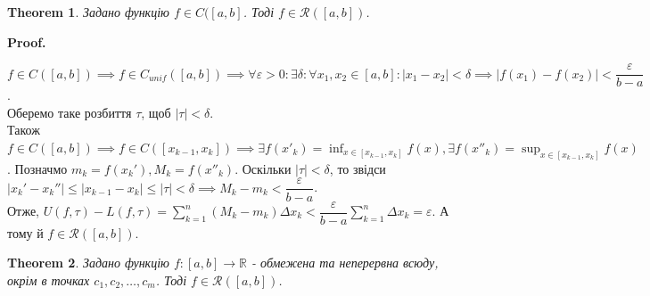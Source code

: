 \documentclass[a4paper, 10pt]{article}
\makeatletter
\def\huge{\displaystyle}
\def\qed{$\blacksquare$}
\theoremstyle{theoremdd}
\newtheorem{theorem}{Theorem}[subsection]
\theoremstyle{theoremdd}
\theoremstyle{theoremdd}
\theoremstyle{theoremdd}
\theoremstyle{theoremdd}
\theoremstyle{theoremdd}
\theoremstyle{theoremdd}
\theoremstyle{theoremdd}
\theoremstyle{theoremdd}
\renewenvironment{proof}[1][Proof.\\]{\par
\pushQED{\hfill \qed}%
\normalfont \topsep6\p@\@plus6\p@\relax
\trivlist
\item\relax
{\bfseries
#1\@addpunct{.}}\hspace\labelsep\ignorespaces
}{%
\popQED\endtrivlist\@endpefalse
}
\makeatother
\begin{document}
\begin{theorem}
Задано функцію $f \in C([a,b]$. Тоді $f \in \mathcal{R}([a,b])$.
\end{theorem}

\begin{proof}
$f \in C([a,b]) \implies f \in C_{unif}([a,b]) \implies \forall \varepsilon > 0: \exists \delta: \forall x_1,x_2 \in [a,b]: |x_1-x_2| < \delta \implies |f(x_1)-f(x_2)| < \dfrac{\varepsilon}{b-a}$.\\
Оберемо таке розбиття $\tau$, щоб $|\tau| < \delta$.\\
Також $f \in C([a,b]) \implies f \in C([x_{k-1},x_k]) \implies \huge \exists f(x'_k) = \inf_{x \in [x_{k-1},x_k]} f(x), \exists f(x''_k) = \sup_{x \in [x_{k-1},x_k]} f(x)$. Позначмо $m_k = f(x_k'), M_k = f(x''_k)$. Оскільки $|\tau| < \delta$, то звідси $|x_k'-x_k''| \leq |x_{k-1}-x_k| \leq |\tau| < \delta \implies M_k - m_k < \dfrac{\varepsilon}{b-a}$.\\
Отже, $U(f,\tau) - L(f,\tau) = \huge\sum_{k=1}^n (M_k-m_k)\Delta x_k < \dfrac{\varepsilon}{b-a} \sum_{k=1}^n \Delta x_k = \varepsilon$. А тому й $f \in \mathcal{R}([a,b])$.
\end{proof}

\begin{theorem}
Задано функцію $f: [a,b] \to \mathbb{R}$ - обмежена та неперервна всюду, окрім в точках $c_1,c_2,\dots,c_m$. Тоді $f \in \mathcal{R}([a,b])$.
\end{theorem}
\end{document}
